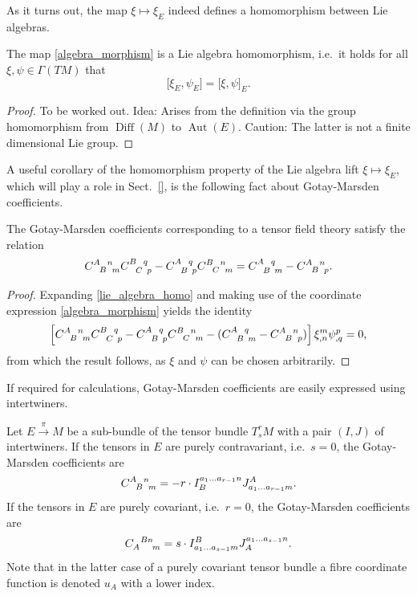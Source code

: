 As it turns out, the map $\xi\mapsto \xi_E$ indeed defines a homomorphism between Lie algebras.
\begin{proposition}
  The map \eqref{algebra_morphism} is a Lie algebra homomorphism, i.e.~it holds for all $\xi,\psi\in\Gamma(TM)$ that
  \begin{equation}\label{lie_algebra_homo}
    \lbrack \xi_E,\psi_E\rbrack = \lbrack \xi,\psi\rbrack_E.
  \end{equation}
\end{proposition}
\begin{proof}
  To be worked out. Idea: Arises from the definition via the group homomorphism from $\operatorname{Diff}(M)$ to $\operatorname{Aut}(E)$. Caution: The latter is not a finite dimensional Lie group.
\end{proof}
A useful corollary of the homomorphism property of the Lie algebra lift $\xi\mapsto\xi_E$, which will play a role in Sect.~\ref{}, is the following fact about Gotay-Marsden coefficients.
\begin{corollary}
  The Gotay-Marsden coefficients  corresponding to a tensor field theory satisfy the relation
  \begin{equation}
    \gmc{A}{B}{n}{m} \gmc{B}{C}{q}{p} - \gmc{A}{B}{q}{p} \gmc{B}{C}{n}{m} = \gmc{A}{B}{q}{m} - \gmc{A}{B}{n}{p}.
  \end{equation}
\end{corollary}
\begin{proof}
  Expanding \eqref{lie_algebra_homo} and making use of the coordinate expression \eqref{algebra_morphism} yields the identity
  \begin{equation}
    \left\lbrack\gmc{A}{B}{n}{m} \gmc{B}{C}{q}{p} - \gmc{A}{B}{q}{p} \gmc{B}{C}{n}{m} - (\gmc{A}{B}{q}{m} - \gmc{A}{B}{n}{p})\right\rbrack \xi^m_{,n} \psi^p_{,q} = 0,
  \end{equation}
  from which the result follows, as $\xi$ and $\psi$ can be chosen arbitrarily.
\end{proof}

If required for calculations, Gotay-Marsden coefficients are easily expressed using intertwiners.
\begin{proposition}
  Let $E\overset{\pi}{\longrightarrow} M$ be a sub-bundle of the tensor bundle $T^r_sM$ with a pair $(I,J)$ of intertwiners. If the tensors in $E$ are purely contravariant, i.e.~$s=0$, the Gotay-Marsden coefficients are
  \begin{equation}
    \gmc{A}{B}{n}{m} = -r \cdot I^{a_1\dots a_{r-1}n}_B J^A_{a_1\dots a_{r-1}m}.
  \end{equation}
  If the tensors in $E$ are purely covariant, i.e.~$r=0$, the Gotay-Marsden coefficients are
  \begin{equation}
    \gmcd{A}{B}{n}{m} = s \cdot I^B_{a_1\dots a_{s-1}m} J^{a_1\dots a_{s-1}n}_A.
  \end{equation}
  Note that in the latter case of a purely covariant tensor bundle a fibre coordinate function is denoted $u_A$ with a lower index.
\end{proposition}

